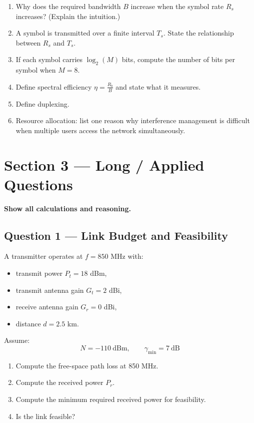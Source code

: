\documentclass[11pt,a4paper]{article}
\begin{document}
\begin{enumerate}[leftmargin=0.9cm]
\item Why does the required bandwidth $B$ increase when the symbol rate $R_s$ increases? (Explain the intuition.)

\item A symbol is transmitted over a finite interval $T_s$. State the relationship between $R_s$ and $T_s$.

\item If each symbol carries $\log_2(M)$ bits, compute the number of bits per symbol when $M=8$.

\item Define spectral efficiency $\eta = \frac{R_b}{B}$ and state what it measures.

\item Define duplexing.

\item Resource allocation: list one reason why interference management is difficult when multiple users access the network simultaneously.
\end{enumerate}

\newpage
\section*{Section 3 --- Long / Applied Questions}
\textbf{Show all calculations and reasoning.}

\subsection*{Question 1 --- Link Budget and Feasibility}
A transmitter operates at $f = 850$ MHz with:
\begin{itemize}[leftmargin=1.2cm]
    \item transmit power $P_t = 18$ dBm,
    \item transmit antenna gain $G_t = 2$ dBi,
    \item receive antenna gain $G_r = 0$ dBi,
    \item distance $d = 2.5$ km.
\end{itemize}

Assume:
\[
N = -110\ \mathrm{dBm}, \qquad \gamma_{\min} = 7\ \mathrm{dB}
\]

\begin{enumerate}[label=\alph*)]
    \item Compute the free-space path loss at 850 MHz.
    \item Compute the received power $P_r$.
    \item Compute the minimum required received power for feasibility.
    \item Is the link feasible?
\end{enumerate}
\end{document}
